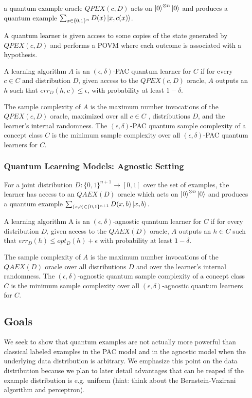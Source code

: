 \documentclass[main.tex]{subfiles}
\begin{document}
{a quantum example oracle $QPEX(c,D)$ acts on $\ket{0}^{\otimes n}\ket{0}$ and produces a quantum example $\sum_{x\in\{0,1\}^n} D(x)\ket{x,c(x)}$.

A quantum learner is given access to some copies of the state generated by $QPEX(c,D)$ and performs a POVM where each outcome is associated with a hypothesis. 

A learning algorithm $A$ is an $(\epsilon, \delta)$-PAC quantum learner for $C$ if for every $c \in C$ and distribution $D$, given access to the $QPEX(c,D)$ oracle, $A$ outputs an $h$ such that $err_D (h, c) \leq \epsilon$, with probability at least $1 - \delta$.

The sample complexity of $A$ is the maximum number invocations of the $QPEX(c,D)$ oracle, maximized over all $c \in C$ , distributions $D$, and the learner’s internal randomness. The $(\epsilon, \delta)$-PAC quantum sample complexity of a concept class $C$ is the minimum sample complexity over all $(\epsilon,\delta)$-PAC quantum learners for $C$.

\subsubsection{Quantum Learning Models: Agnostic Setting}

For a joint distribution $D : \{0, 1\}^{n+1} \rightarrow [0, 1]$ over the set of examples, the learner has access to an $QAEX(D)$ oracle which acts on $\ket{0}^{\otimes n}\ket{0}$ and produces a quantum example $\sum_{(x, b)\in\{0,1\}^{n+1}} D(x,b)\ket{x,b}$. 

A learning algorithm A is an $(\epsilon, \delta)$-agnostic quantum learner for $C$ if for every distribution $D$, given access to the $QAEX(D)$ oracle, $A$ outputs an $h \in C$ such that $err_D (h) \leq opt_D(h) + \epsilon$ with probability at least $1 - \delta$.

The sample complexity of $A$ is the maximum number invocations of the $QAEX(D)$ oracle over all distributions $D$ and over the learner’s internal randomness. The $(\epsilon, \delta)$-agnostic quantum sample complexity of a concept class $C$ is the minimum sample complexity over all $(\epsilon, \delta)$-agnostic quantum learners for $C$.

\subsection{Goals}

We seek to show that quantum examples are not actually more powerful than classical labeled examples in the PAC model and in the agnostic model when the underlying data distribution is arbitrary. We emphasize this point on the data distribution because we plan to later detail advantages that can be reaped if the example distribution is e.g. uniform (hint: think about the Bernstein-Vazirani algorithm and perceptron).

}
\end{document}
